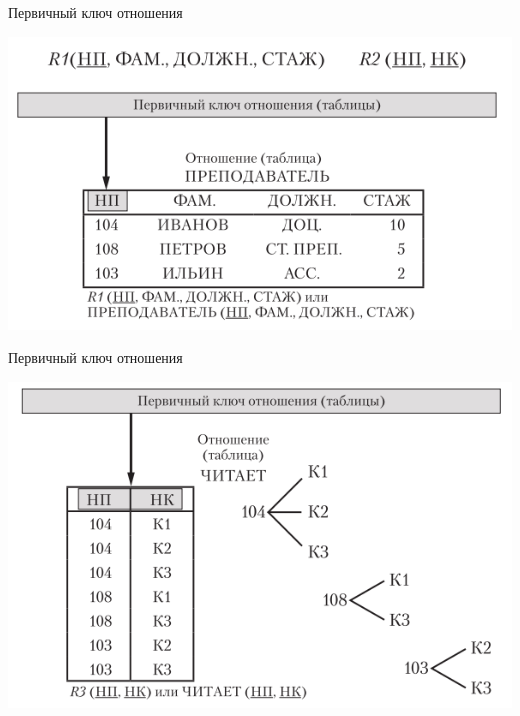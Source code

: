 \documentclass{beamer}
\begin{document}
\begin{frame}{Первичный ключ отношения}
\begin{center}
\includegraphics[scale=0.75]{images/rel-04.png}
\end{center}
\end{frame}
\begin{frame}{Первичный ключ отношения}
\begin{center}
\includegraphics[scale=0.75]{images/rel-05.png}
\end{center}
\end{frame}
\end{document}
